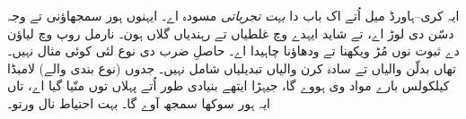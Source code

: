 \documentclass[../../../include/open-logic-chapter]{subfiles}
\begin{document}

\begin{editorial}
  ایہ کری–ہاورڈ میل اُتے اک باب دا \emph{بہت تجرباتی} مسودہ اے۔ ایہنوں ہور سمجھاؤنی تے وجہ دسّن دی لوڑ اے، تے شاید ایہدے وچ غلطیاں تے رہندیاں گلاں ہون۔ نارمل روپ وچ لیاؤن دے ثبوت نوں مُڑ ویکھنا تے ودھاؤنا چاہیدا اے۔ حاصلِ ضرب دی نوع لئی کوئی مثال نہیں۔ تھاں بدلّن والیاں تے سادہ کرن والیاں تبدیلیاں شامل نہیں۔ جدوں (نوع بندی والے) لامبڈا کیلکولس بارے مواد وی ہووے گا، جیہڑا ایتھے بنیادی طور اُتے پہلاں توں منّیا گیا اے، تاں ایہ ہور سوکھا سمجھ آوے گا۔ بہت احتیاط نال ورتو۔
\end{editorial}


\OLEndChapterHook
\end{document}
